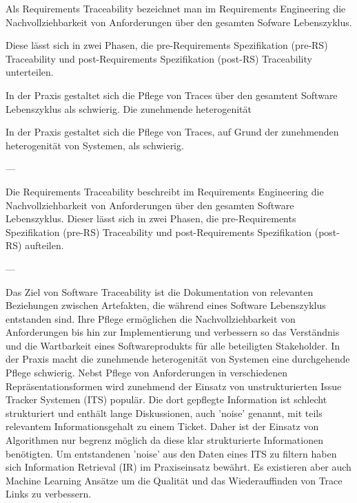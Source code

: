 Als Requirements Traceability bezeichnet man im Requirements Engineering die Nachvollziehbarkeit von Anforderungen über den gesamten Sofware Lebenszyklus.

Diese lässt sich in zwei Phasen, die pre-Requirements Spezifikation (pre-RS) Traceability und post-Requirements Spezifikation (post-RS) Traceability unterteilen. 

In der Praxis gestaltet sich die Pflege von Traces über den gesamtent Software Lebenszyklus als schwierig. Die zunehmende heterogenität 

In der Praxis gestaltet sich die Pflege von Traces, auf Grund der zunehmenden heterogenität von Systemen, als schwierig.

---

Die Requirements Traceability beschreibt im Requirements Engineering die Nachvollziehbarkeit von Anforderungen über den gesamten Software Lebenszyklus. Dieser lässt sich in zwei Phasen, die pre-Requirements Spezifikation (pre-RS) Traceability und post-Requirements Spezifikation (post-RS) aufteilen.

---

Das Ziel von Software Traceability ist die Dokumentation von relevanten Beziehungen zwischen Artefakten, die während eines Software Lebenszyklus entstanden sind. Ihre Pflege ermöglichen die Nachvollziehbarkeit von Anforderungen bis hin zur Implementierung und verbessern so das Verständnis und die Wartbarkeit eines Softwareprodukts für alle beteiligten Stakeholder. In der Praxis macht die zunehmende heterogenität von Systemen eine durchgehende Pflege schwierig. Nebst Pflege von Anforderungen in verschiedenen Repräsentationsformen wird zunehmend der Einsatz von unstrukturierten Issue Tracker Systemen (ITS) populär. Die dort gepflegte Information ist schlecht strukturiert und enthält lange Diskussionen, auch 'noise' genannt, mit teils relevantem Informationsgehalt zu einem Ticket. Daher ist der Einsatz von Algorithmen nur begrenz möglich da diese klar strukturierte Informationen benötigten. Um entstandenen 'noise' aus den Daten eines ITS zu filtern haben sich Information Retrieval (IR) im Praxiseinsatz bewährt. Es existieren aber auch Machine Learning Ansätze um die Qualität und das Wiederauffinden von Trace Links zu verbessern.